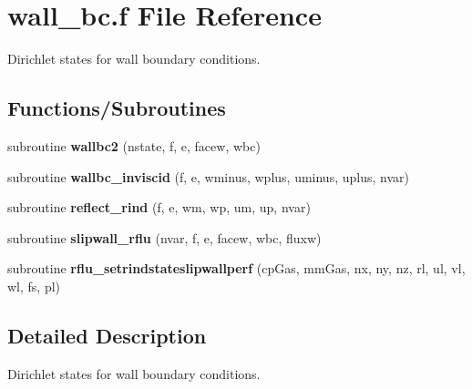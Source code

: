 \hypertarget{wall__bc_8f}{\section{wall\-\_\-bc.\-f File Reference}
\label{wall__bc_8f}
}


Dirichlet states for wall boundary conditions.  


\subsection*{Functions/\-Subroutines}
\begin{DoxyCompactItemize}
\item 
\hypertarget{wall__bc_8f_a00a68892dcc16c26b700fff4458dee8e}{subroutine {\bfseries wallbc2} (nstate, f, e, facew, wbc)}\label{wall__bc_8f_a00a68892dcc16c26b700fff4458dee8e}

\item 
\hypertarget{wall__bc_8f_ae85c1fd836c0520249e15da199122031}{subroutine {\bfseries wallbc\-\_\-inviscid} (f, e, wminus, wplus, uminus, uplus, nvar)}\label{wall__bc_8f_ae85c1fd836c0520249e15da199122031}

\item 
\hypertarget{wall__bc_8f_a4f8d528270d6ace42e44b37f6bc83a95}{subroutine {\bfseries reflect\-\_\-rind} (f, e, wm, wp, um, up, nvar)}\label{wall__bc_8f_a4f8d528270d6ace42e44b37f6bc83a95}

\item 
\hypertarget{wall__bc_8f_a373e8f41852bba041b8e2401e0fed740}{subroutine {\bfseries slipwall\-\_\-rflu} (nvar, f, e, facew, wbc, fluxw)}\label{wall__bc_8f_a373e8f41852bba041b8e2401e0fed740}

\item 
\hypertarget{wall__bc_8f_a1a0e9b0c3249b2d2c99a440305189282}{subroutine {\bfseries rflu\-\_\-setrindstateslipwallperf} (cp\-Gas, mm\-Gas, nx, ny, nz, rl, ul, vl, wl, fs, pl)}\label{wall__bc_8f_a1a0e9b0c3249b2d2c99a440305189282}

\end{DoxyCompactItemize}


\subsection{Detailed Description}
Dirichlet states for wall boundary conditions. 